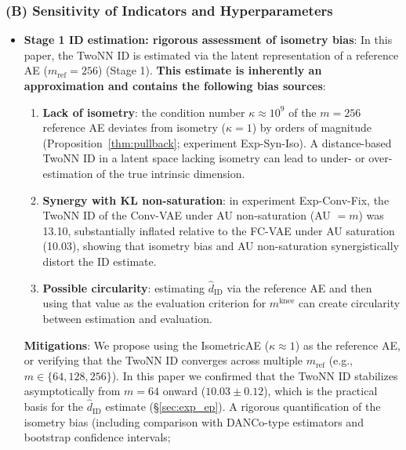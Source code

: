 \documentclass[make,article,submit,pdftex,moreauthors]{Definitions/mdpi}
\newcommand{\kap}{\kappa}
\newcommand{\mknee}{m^{\mathrm{knee}}}
\begin{document}
\subsubsection*{(B) Sensitivity of Indicators and Hyperparameters}

\begin{itemize}
  \item \textbf{Stage 1 ID estimation: rigorous assessment of isometry bias}:
        In this paper, the TwoNN ID is estimated via the latent representation of a
        reference AE ($m_\mathrm{ref}=256$) (Stage 1).
        \textbf{This estimate is inherently an approximation and contains the following
        bias sources}:
        \begin{enumerate}[label=(\roman*)]
          \item \textbf{Lack of isometry}: the condition number $\kap \approx 10^9$ of
                the $m=256$ reference AE deviates from isometry ($\kap=1$) by orders of
                magnitude (Proposition~\ref{thm:pullback}; experiment Exp-Syn-Iso).
                A distance-based TwoNN ID in a latent space lacking isometry can lead
                to under- or over-estimation of the true intrinsic dimension.
          \item \textbf{Synergy with KL non-saturation}: in experiment Exp-Conv-Fix, the
                TwoNN ID of the Conv-VAE under AU non-saturation (AU $=m$) was 13.10,
                substantially inflated relative to the FC-VAE under AU saturation
                (10.03), showing that isometry bias and AU non-saturation synergistically
                distort the ID estimate.
          \item \textbf{Possible circularity}: estimating $\hat{d}_\mathrm{ID}$ via the
                reference AE and then using that value as the evaluation criterion for
                $\mknee$ can create circularity between estimation and evaluation.
        \end{enumerate}
        \textbf{Mitigations}: We propose using the IsometricAE ($\kap \approx 1$) as
        the reference AE, or verifying that the TwoNN ID converges across multiple
        $m_\mathrm{ref}$ (e.g., $m \in \{64, 128, 256\}$).
        In this paper we confirmed that the TwoNN ID stabilizes asymptotically from
        $m=64$ onward ($10.03 \pm 0.12$), which is the practical basis for the
        $\hat{d}_\mathrm{ID}$ estimate (\S\ref{sec:exp_ep}).
        A rigorous quantification of the isometry bias (including comparison with
        DANCo-type estimators and bootstrap confidence intervals;

\end{itemize}
\end{document}
